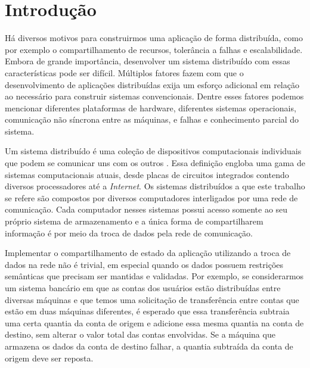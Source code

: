 \documentclass[11pt,twoside,a4paper]{book}
\begin{document}
\listoffigures
\listofalgorithms

\mainmatter

\fancyhead[RE,LO]{\thesection}

\singlespacing              %

\chapter{Introdução}
\label{chap:introducao}
Há diversos motivos para construirmos uma aplicação de forma distribuída, como por exemplo o compartilhamento de recursos, tolerância a falhas e escalabilidade. Embora de grande importância, desenvolver um sistema distribuído com essas características pode ser difícil. Múltiplos fatores fazem com que o desenvolvimento de aplicações distribuídas exija um esforço adicional em relação ao necessário para construir sistemas  convencionais. Dentre esses fatores podemos mencionar diferentes plataformas de hardware, diferentes sistemas operacionais, comunicação não síncrona entre as máquinas, e falhas e conhecimento parcial do sistema.

Um sistema distribuído é uma coleção de dispositivos computacionais individuais que podem se comunicar uns com os outros \cite{tanenbaum, distributed_computing}. Essa definição engloba uma gama de sistemas computacionais atuais, desde placas de circuitos integrados contendo diversos processadores até a \emph{Internet}. Os sistemas distribuídos a que este trabalho se refere são compostos por diversos computadores interligados por uma rede de comunicação. Cada computador nesses sistemas possui acesso somente ao seu próprio sistema de armazenamento e a única forma de compartilharem informação é por meio da troca de dados pela rede de comunicação.

Implementar o compartilhamento de estado da aplicação utilizando a troca de dados na rede não é trivial, em especial quando os dados possuem restrições semânticas que precisam ser mantidas e validadas. Por exemplo, se 
considerarmos um sistema bancário em que as contas dos usuários estão distribuídas entre diversas máquinas e que temos uma solicitação de transferência entre contas que estão em duas máquinas diferentes, é esperado que essa transferência subtraia uma certa quantia da conta de origem e adicione essa mesma quantia na conta de destino, sem alterar o valor total das contas envolvidas. Se a máquina que armazena os dados da conta de destino falhar, a quantia subtraída da conta de origem deve ser reposta.
\end{document}
